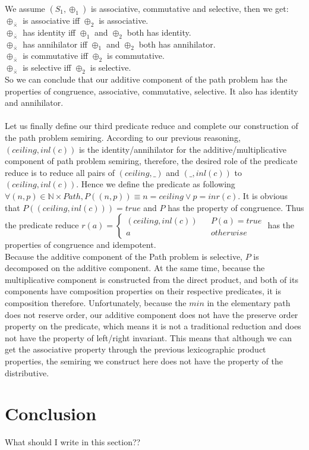 \documentclass[a4paper,10pt]{article}
\begin{document}
We assume $(S_1,\oplus_1)$ is associative, commutative and selective, then we get:\\
$\oplus_{\bar{\times}}$ is associative iff $\oplus_2$ is associative.\\
$\oplus_{\bar{\times}}$ has identity iff $\oplus_1$ and $\oplus_2$ both has identity.\\
$\oplus_{\bar{\times}}$ has annihilator iff $\oplus_1$ and $\oplus_2$ both has annihilator.\\
$\oplus_{\bar{\times}}$ is commutative iff $\oplus_2$ is commutative.\\
$\oplus_{\bar{\times}}$ is selective iff $\oplus_2$ is selective.\\
So we can conclude that our additive component of the path problem has the properties of congruence, associative, commutative, selective. It also has identity and annihilator.\\\\
Let us finally define our third predicate reduce and complete our construction of the path problem semiring. According to our previous reasoning, $(ceiling,inl (c))$ is the identity/annihilator for the additive/multiplicative component of path problem semiring, therefore, the desired role of the predicate reduce is to reduce all pairs of $(ceiling,\_)$ and $(\_,inl(c))$ to $(ceiling,inl(c))$.
Hence we define the predicate as following $\forall (n,p) \in \mathbb{N}\times Path, P((n,p)) \equiv n = ceiling \vee p = inr(c)$. It is obvious that $P((ceiling,inl (c))) = true$ and $P$ has the property of congruence. Thus the predicate reduce $r(a) = \left\{
\begin{aligned}
(ceiling,inl (c)) &  & P(a) = true \\
a &  & otherwise 
\end{aligned}
\right.$ has the properties of congruence and idempotent.\\
Because the additive component of the Path problem is selective, $P$ is decomposed on the additive component.
At the same time, because the multiplicative component is constructed from the direct product, and both of its components have composition properties on their respective predicates, it is composition therefore.
Unfortunately, because the $min$ in the elementary path does not reserve order, our additive component does not have the preserve order property on the predicate, which means it is not a traditional reduction and does not have the property of left/right invariant. This means that although we can get the associative property through the previous lexicographic product properties, the semiring we construct here does not have the property of the distributive.
\section{Conclusion}
What should I write in this section??
\medskip

 

\end{document}
